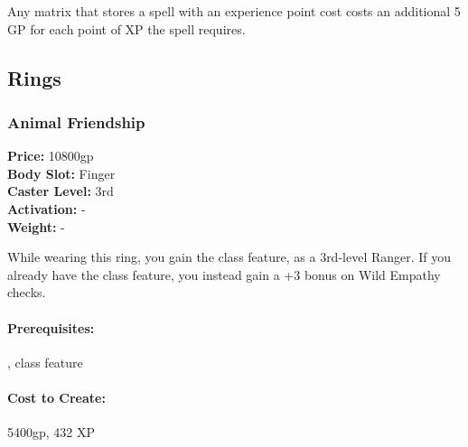 Any matrix that stores a spell with an experience point cost costs an additional 5 GP for each point of XP the spell requires.
\subsection{Rings}
\subsubsection{Animal Friendship}
\label{Item:AnimalFriendship}
   \textbf{Price:} 10800gp
\\ \textbf{Body Slot:} Finger
\\ \textbf{Caster Level:} 3rd
\\ \textbf{Activation:} -
\\ \textbf{Weight:} -

While wearing this ring, you gain the  class feature, as a 3rd-level Ranger. If you already have the class feature, you instead gain a +3 bonus on Wild Empathy checks.


\paragraph{Prerequisites:} ,  class feature

\paragraph{Cost to Create:} 5400gp, 432 XP
% 
% 
% 

